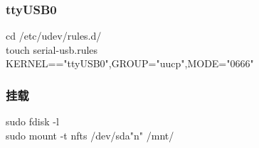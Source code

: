 \documentclass{beamer}
\newcommand{\quotes}[1]{"#1"}
\begin{document}
\begin{CJK}{UTF8}{gkai}
 \begin{frame}\frametitle{ttyUSB0}
   cd /etc/udev/rules.d/ \\
   touch serial-usb.rules\\
    KERNEL=="ttyUSB0",GROUP="uucp",MODE="0666"
 \end{frame}

 \begin{frame}\frametitle{挂载}
   sudo fdisk -l\\
   sudo mount -t nfts /dev/sda\quotes{n} /mnt/
 \end{frame}



\end{CJK}
\end{document}
